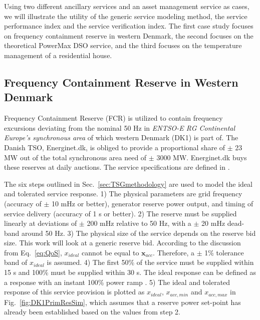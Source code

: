 Using two different ancillary services and an asset management service as cases, we will illustrate the utility of the generic service modeling method, the service performance index and the service verification index. The first case study focuses on frequency containment reserve in western Denmark, the second focuses on the theoretical PowerMax DSO service, and the third focuses on the temperature management of a residential house. 

\subsection{Frequency Containment Reserve in Western Denmark}
Frequency Containment Reserve (FCR) is utilized to contain frequency excursions deviating from the nominal 50 Hz in \emph{ENTSO-E RG Continental Europe’s synchronous area} of which western Denmark (DK1) is part of. The Danish TSO, Energinet.dk, is obliged to provide a proportional share of $\pm$ 23 MW \cite{EnerginetAncillary} out of the total synchronous area need of $\pm$ 3000 MW. Energinet.dk buys these reserves at daily auctions. The service specifications are defined in \cite{EnerginetAncillary}.

The six steps outlined in Sec.~\ref{sec:TSGmethodology} are used to model the ideal and tolerated service response. 1) The physical parameters are grid frequency (accuracy of $\pm$ 10 mHz or better), generator reserve power output, and timing of service delivery (accuracy of 1 s or better). 2) The reserve must be supplied linearly at deviations of $\pm$ 200 mHz relative to 50 Hz, with a $\pm$ 20 mHz dead-band around 50 Hz. 3) The physical size of the service depends on the reserve bid size. This work will look at a generic reserve bid. According to the discussion from Eq.~\eqref{eq:QoS}, $x_{ideal}$ cannot be equal to $\mathbf{x}_{acc}$. Therefore, a $\pm$ 1\% tolerance band of $x_{ideal}$ is assumed. 4) The first 50\% of the service must be supplied within 15 s and 100\% must be supplied within 30 s. The ideal response can be defined as a response with an instant 100\% power ramp \cite{makarov2008assessing}. 5) The ideal and tolerated response of this service provision is plotted as $x_{ideal}$, $x_{acc,min}$ and $x_{acc,max}$ in Fig.~\ref{fig:DK1PrimResSim}, which assumes that a reserve power set-point has already been established based on the values from step 2.%


